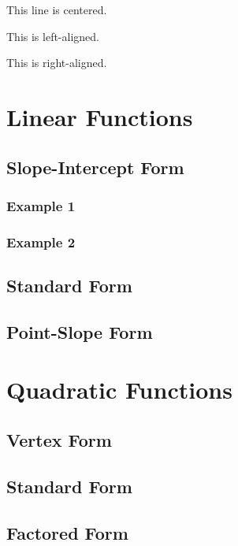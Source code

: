 \documentclass[11pt]{article}
\begin{document}
  \vspace{1cm}

  \begin{center}
    This line is centered.
  \end{center}

  \begin{flushleft}
    This is left-aligned.
  \end{flushleft}

  \begin{flushright}
    This is right-aligned.
  \end{flushright}

  \section{Linear Functions}
    \subsection{Slope-Intercept Form}
      \subsubsection{Example 1}
      \subsubsection{Example 2}
    \subsection{Standard Form}
    \subsection{Point-Slope Form}
  \section{Quadratic Functions}
    \subsection{Vertex Form}
    \subsection{Standard Form}
    \subsection{Factored Form}
\end{document}
